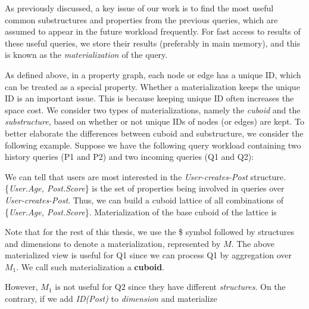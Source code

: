 As previously discussed, a key issue of our work is to find the most useful common substructures and properties from the previous queries, which are assumed to appear in the future workload frequently. For fast access to results of these useful queries, we store their results (preferably in main memory), and this is known as the \textit{materialization} of the query. 

As defined above, in a property graph, each node or edge has a unique ID, which can be treated as a special property. Whether a materialization keeps the unique ID is an important issue. This is because keeping unique ID often increases the space cost. We consider two types of materializations, namely the \emph{cuboid} and the \emph{substructure}, based on whether or not unique IDs of nodes (or edges) are kept. To better elaborate the differences between cuboid and substructure, we consider the following example. Suppose we have the following query workload containing two history queries (P1 and P2) and two incoming queries (Q1 and Q2):









We can tell that users are most interested in  the \textit{User-creates-Post} structure. \{\emph{User.Age, Post.Score}\} is the set of properties being involved in queries over \textit{User-creates-Post}. Thus, we can build a cuboid lattice of all combinations of  \{\emph{User.Age, Post.Score}\}. Materialization of the base cuboid of the lattice is


\noindent Note that for the rest of this thesis, we use the \$ symbol followed by structures and dimensions to denote a materialization, represented by $M$. The above materialized view is useful for Q1 since we can process Q1 by aggregation over $M_1$. We call such materialization a \textbf{cuboid}.


However, $M_1$ is not useful for Q2 since they have different \textit{structures}. On the contrary, if we add \textit{ID(Post)} to \textit{dimension} and materialize

